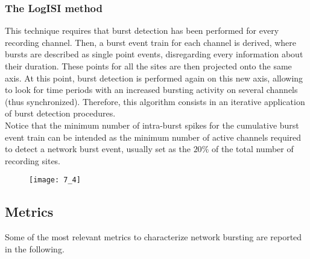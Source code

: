 \subsubsection{The LogISI method}
This technique requires that burst detection has been performed for every
recording channel. Then, a burst event train for each channel is derived, where
bursts are described as single point events, disregarding every information about
their duration. These points for all the sites are then projected onto the same axis.
At this point, burst detection is performed again on this new axis, allowing
to look for time periods with an increased bursting activity on several channels (thus
synchronized). Therefore, this algorithm consists in an iterative application of burst detection procedures.\\
Notice that the minimum number of intra-burst spikes for the cumulative
burst event train can be intended as the minimum number of active channels required
to detect a network burst event, usually set as the \(20\%\) of the total number of
recording sites.
\begin{figure}[H]
    \texttt{[image: 7\_4]}
    \centering
\end{figure}

\subsection{Metrics}
Some of the most relevant metrics to characterize network bursting are reported
in the following.
